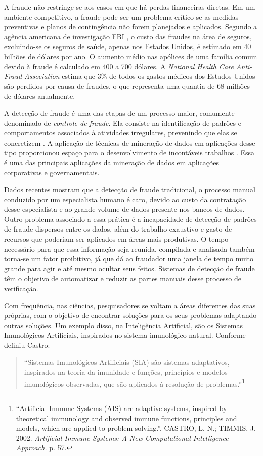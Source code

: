 A fraude não restringe-se aos casos em que há perdas financeiras diretas. Em um ambiente competitivo, a fraude pode ser um problema crítico se as medidas preventivas e planos de contingência não forem planejados e aplicados. Segundo a agência americana de investigação FBI \cite{FBI2010}, o custo das fraudes na área de seguros, excluindo-se os seguros de saúde, apenas nos Estados Unidos, é estimado em 40 bilhões de dólares por ano. O aumento médio nas apólices de uma família comum devido à fraude é calculado em 400 a 700 dólares. A \emph{National Health Care Anti-Fraud Association} estima que 3\% de todos os gastos médicos dos Estados Unidos são perdidos por causa de fraudes, o que representa uma quantia de 68 milhões de dólares anualmente.

A detecção de fraude é uma das etapas de um processo maior, comumente denominado de \emph{controle de fraude}. Ela consiste na identificação de padrões e comportamentos associados à atividades irregulares, prevenindo que elas se concretizem \cite{Phua2010}. A aplicação de técnicas de mineração de dados em aplicações desse tipo proporcionou espaço para o desenvolvimento de incontáveis trabalhos \cite{Phua2010}. Essa é uma das principais aplicações da mineração de dados em aplicações corporativas e governamentais.

Dados recentes mostram que a detecção de fraude tradicional, o processo manual conduzido por um especialista humano é caro, devido ao custo da contratação desse especialista e ao grande volume de dados presente nos bancos de dados. Outro problema associado a essa prática é a incapacidade de detecção de padrões de fraude dispersos entre os dados, além do trabalho exaustivo e gasto de recursos que poderiam ser aplicados em áreas mais produtivas. O tempo necessário para que essa informação seja reunida, compilada e analisada também torna-se um fator proibitivo, já que dá ao fraudador uma janela de tempo muito grande para agir e até mesmo ocultar seus feitos. Sistemas de detecção de fraude têm o objetivo de automatizar e reduzir as partes manuais desse processo de verificação.

Com frequência, nas ciências, pesquisadores se voltam a áreas diferentes das suas próprias, com o objetivo de encontrar soluções para os seus problemas adaptando outras soluções. Um exemplo disso, na Inteligência Artificial, são os Sistemas Imunológicos Artificiais, inspirados no sistema imunológico natural. Conforme definiu Castro:

\begin{quote}
``Sistemas Imunológicos Artificiais (SIA) são sistemas adaptativos, inspirados na teoria da imunidade e funções, princípios e modelos imunológicos observadas, que são aplicados à resolução de problemas.''\footnote{``Artificial Immune Systems (AIS) are adaptive systems, inspired by theoretical immunology and observed immune functions, principles and models, which are applied to problem solving.''. CASTRO, L. N.; TIMMIS, J. 2002. \emph{Artificial Immune Systems: A New Computational Intelligence Approach.} p. 57.}
\end{quote}

